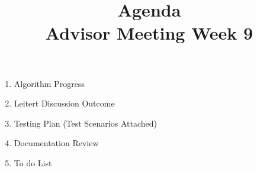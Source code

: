 \documentclass{article}
\title{Agenda \\ Advisor Meeting Week 9}
\date{}
\begin{document}
\maketitle
\begin{enumerate}
\item Algorithm Progress
\item Leitert Discussion Outcome
\item Testing Plan (Test Scenarios Attached)
\item Documentation Review
\item To do List
\end{enumerate}
\end{document}
